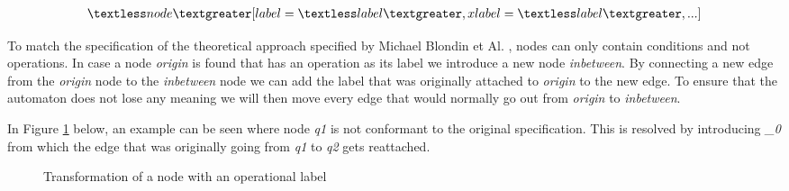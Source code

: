 \documentclass[12pt]{thesis}
\begin{document}
\begin{gather*}
\textless node \textgreater [label=\textless label\textgreater, xlabel=\textless label\textgreater, ...]
\end{gather*}

To match the specification of the theoretical approach specified by Michael Blondin et Al. \cite{blondin2021continuous}, nodes can only contain conditions and not operations. In case a node \textit{origin} is found that has an operation as its label we introduce a new node \textit{inbetween}. By connecting a new edge from the \textit{origin} node to the \textit{inbetween} node we can add the label that was originally attached to \textit{origin} to the new edge. To ensure that the automaton does not lose any meaning we will then move every edge that would normally go out from \textit{origin} to \textit{inbetween}.

In Figure \ref{fig:nodetransformlabel} below, an example can be seen where node \textit{q1} is not conformant to the original specification. This is resolved by introducing \textit{\_0} from which the edge that was originally going from \textit{q1} to \textit{q2} gets reattached.

\begin{figure}[h]%
	\centering
	\qquad
	\caption{Transformation of a node with an operational label}
	\label{fig:nodetransformlabel}
\end{figure}
\end{document}

